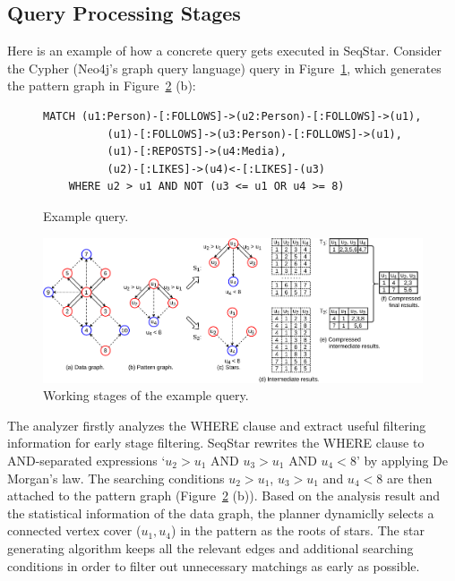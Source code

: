 \subsection{Query Processing Stages}
Here is an example of how a concrete query gets executed in SeqStar.
Consider the Cypher (Neo4j's graph query language) query in Figure~\ref{img:cypher_query},
which generates the pattern graph in Figure~\ref{img:running_example} (b):

\begin{figure}[ht]
  \begin{Verbatim}[fontsize=\small]
    MATCH (u1:Person)-[:FOLLOWS]->(u2:Person)-[:FOLLOWS]->(u1),
          (u1)-[:FOLLOWS]->(u3:Person)-[:FOLLOWS]->(u1),
          (u1)-[:REPOSTS]->(u4:Media),
          (u2)-[:LIKES]->(u4)<-[:LIKES]-(u3)
    WHERE u2 > u1 AND NOT (u3 <= u1 OR u4 >= 8)
  \end{Verbatim}
  \caption{Example query.}\label{img:cypher_query}
\end{figure}

\begin{figure}[ht]
  \centering
  \includegraphics[width=\textwidth]{img/running_example.pdf}
  \caption{Working stages of the example query.}\label{img:running_example}
\end{figure}

The analyzer firstly analyzes the WHERE clause and extract useful filtering information for early stage filtering.
SeqStar rewrites the WHERE clause to AND-separated expressions `$u_2 > u_1$ AND $u_3 > u_1$ AND $u_4 < 8$' by applying De Morgan's law.
The searching conditions $u_2> u_1$, $u_3 > u_1$ and $u_4 < 8$ are then attached to the pattern graph (Figure~\ref{img:running_example} (b)).
Based on the analysis result and the statistical information of the data graph,
the planner dynamiclly selects a connected vertex cover ($u_1, u_4$) in the pattern as the roots of stars.
The star generating algorithm keeps all the relevant edges and additional searching conditions in order to filter out unnecessary matchings as early as possible.


